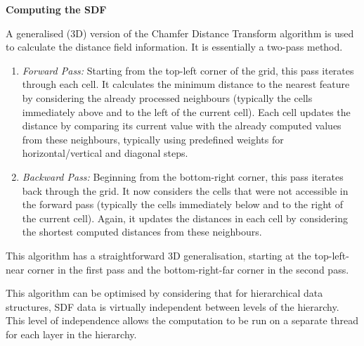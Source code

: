 \textbf{Computing the SDF}

A generalised (3D) version of the Chamfer Distance Transform algorithm\supercite{chamfer} is used to calculate the distance field information.
It is essentially a two-pass method.
\begin{enumerate}
  \item \emph{Forward Pass:} Starting from the top-left corner of the grid, this pass iterates through each cell. It calculates the minimum distance to the nearest feature by considering the already processed neighbours (typically the cells immediately above and to the left of the current cell). Each cell updates the distance by comparing its current value with the already computed values from these neighbours, typically using predefined weights for horizontal/vertical and diagonal steps.

  \item \emph{Backward Pass:} Beginning from the bottom-right corner, this pass iterates back through the grid. It now considers the cells that were not accessible in the forward pass (typically the cells immediately below and to the right of the current cell). Again, it updates the distances in each cell by considering the shortest computed distances from these neighbours.
\end{enumerate}
This algorithm has a straightforward 3D generalisation, starting at the top-left-near corner in the first pass and the bottom-right-far corner in the second pass.

This algorithm can be optimised by considering that for hierarchical data structures, SDF data is virtually independent between levels of the hierarchy.
This level of independence allows the computation to be run on a separate thread for each layer in the hierarchy.

